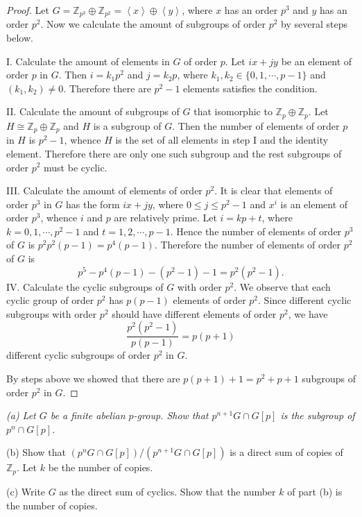 \begin{proof}
Let $G=\mathbb{Z}_{p^3}\oplus\mathbb{Z}_{p^2}=\left<x\right>\oplus\left<y\right>$, where $x$ has an order $p^3$ and $y$ has an order $p^2$. Now we calculate the amount of subgroups of order $p^2$ by several steps below.\par
I. Calculate the amount of elements in $G$ of order $p$. Let $ix+jy$ be an element of order $p$ in $G$. Then $i=k_1p^2$ and $j=k_2p$, where $k_1,k_2\in\{0,1,\cdots,p-1\}$ and $(k_1,k_2)\ne 0$. Therefore there are $p^2-1$ elements satisfies the condition.\par
II. Calculate the amount of subgroups of $G$ that isomorphic to $\mathbb{Z}_p\oplus\mathbb{Z}_p$. Let $H\cong\mathbb{Z}_p\oplus\mathbb{Z}_p$ and $H$ is a subgroup of $G$. Then the number of elements of order $p$ in $H$ is $p^2-1$, whence $H$ is the set of all elements in step I and the identity element. Therefore there are only one such subgroup and the rest subgroups of order $p^2$ must be cyclic.\par
III. Calculate the amount of elements of order $p^2$. It is clear that elements of order $p^3$ in $G$ has the form $ix+jy$, where $0\le j\le p^2-1$ and $x^i$ is an element of order $p^3$, whence $i$ and $p$ are relatively prime. Let $i=kp+t$, where $k=0,1,\cdots,p^2-1$ and $t=1,2,\cdots,p-1$. Hence the number of elements of order $p^3$ of $G$ is $p^2p^2(p-1)=p^4(p-1)$. Therefore the number of elements of order $p^2$ of $G$ is 
$$
p^5-p^4\left( p-1 \right) -\left( p^2-1 \right) -1=p^2\left( p^2-1 \right) .
$$
IV. Calculate the cyclic subgroups of $G$ with order $p^2$. We observe that each cyclic group of order $p^2$ has $p(p-1)$ elements of order $p^2$. Since different cyclic subgroups with order $p^2$ should have different elements of order $p^2$, we have 
$$
\frac{p^2\left( p^2-1 \right)}{p\left( p-1 \right)}=p\left( p+1 \right) 
$$
different cyclic subgroups of order $p^2$ in $G$.\par
By steps above we showed that there are $p(p+1)+1=p^2+p+1$ subgroups of order $p^2$ in $G$.
\end{proof}
\begin{problem}\em
(a) Let $G$ be a finite abelian $p$-group. Show that $p^{n+1}G\cap G[p]$ is the subgroup of $p^n\cap G[p]$.\par
(b) Show that $(p^nG\cap G[p])/(p^{n+1}G\cap G[p])$ is a direct sum of copies of $\mathbb{Z}_p$. Let $k$ be the number of copies.\par
(c) Write $G$ as the direct sum of cyclics. Show that the number $k$ of part (b) is the number of copies.
\end{problem}
